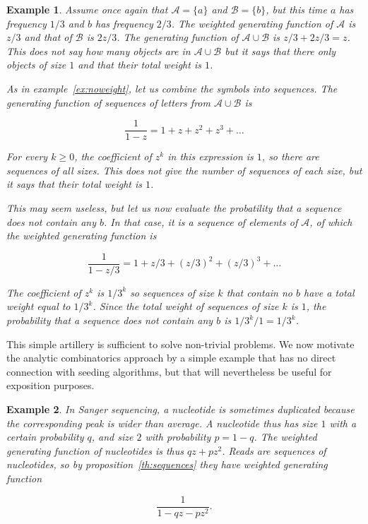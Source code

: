 \documentclass{article}
\newtheorem{example}{Example}
\begin{document}
\begin{example}
Assume once again that $\mathcal{A} = \{a\}$ and $\mathcal{B} = \{b\}$,
but this time $a$ has frequency $1/3$ and $b$ has frequency $2/3$. The
weighted generating function of $\mathcal{A}$ is $z/3$ and that of
$\mathcal{B}$ is $2z/3$. The generating function of $\mathcal{A} \cup
\mathcal{B}$ is $z/3 + 2z/3 = z$. This does not say how many objects are
in $\mathcal{A} \cup \mathcal{B}$ but it says that there only objects of
size $1$ and that their total weight is $1$.

As in example~\ref{ex:noweight}, let us combine the symbols into
sequences. The generating function of sequences of letters from
$\mathcal{A} \cup \mathcal{B}$ is

\begin{equation*}
\frac{1}{1-z} = 1 + z + z^2 + z^3 + \ldots
\end{equation*}

For every $k \geq 0$, the coefficient of $z^k$ in this expression is $1$,
so there are sequences of all sizes. This does not give the number of
sequences of each size, but it says that their total weight is $1$.

This may seem useless, but let us now evaluate the probatility that a
sequence does not contain any $b$. In that case, it is a sequence of
elements of $\mathcal{A}$, of which the weighted generating function is

\begin{equation*}
\frac{1}{1-z/3} = 1 + z/3 + (z/3)^2 + (z/3)^3 + \ldots
\end{equation*}

The coefficient of $z^k$ is $1/3^k$ so sequences of size $k$ that contain
no $b$ have a total weight equal to $1/3^k$. Since the total weight of
sequences of size $k$ is $1$, the probability that a sequence does not
contain any $b$ is $1/3^k \big/ 1 = 1/3^k$.
\end{example}

This simple artillery is sufficient to solve non-trivial problems. We now
motivate the analytic combinatorics approach by a simple example that has
no direct connection with seeding algorithms, but that will nevertheless
be useful for exposition purposes.

\begin{example}
\label{ex:Sanger}
In Sanger sequencing, a nucleotide is sometimes duplicated because the
corresponding peak is wider than average. A nucleotide thus has size $1$
with a certain probability $q$, and size $2$ with probability $p = 1-q$.
The weighted generating function of nucleotides is thus $qz + pz^2$. Reads
are sequences of nucleotides, so by proposition~\ref{th:sequences} they
have weighted generating function

\begin{equation}
\label{eq:Sanger}
\frac{1}{1-qz-pz^2}.
\end{equation}
\end{example}
\end{document}
